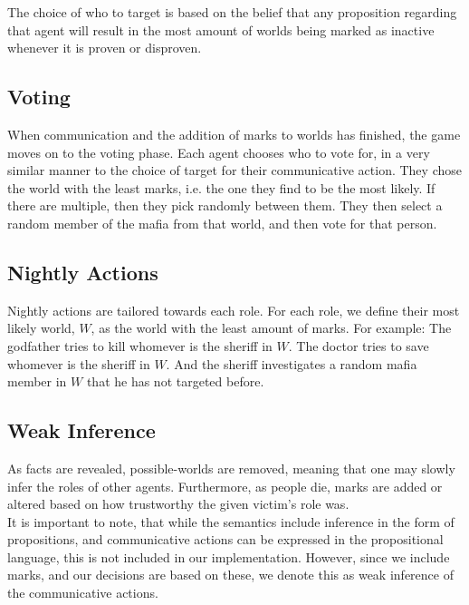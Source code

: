 The choice of who to target is based on the belief that any proposition
regarding that agent will result in the most amount of worlds being marked as
inactive whenever it is proven or disproven.
\subsection{Voting}\label{Voting}
When communication and the addition of marks to worlds has finished, the game
moves on to the voting phase. Each agent chooses who to vote for, in a very
similar manner to the choice of target for their communicative action. They
chose the world with the least marks, i.e. the one they find to be the most
likely. If there are multiple, then they pick randomly between them. They then
select a random member of the mafia from that world, and then vote for that
person.
\subsection{Nightly Actions}\label{NightlyActions}
Nightly actions are tailored towards each role. For each role, we define their
most likely world, $W$, as the world with the least amount of marks. For
example: The godfather tries to kill whomever is the sheriff in $W$. The doctor
tries to save whomever is the sheriff in $W$. And the sheriff investigates a
random mafia member in $W$ that he has not targeted before.
\subsection{Weak Inference}\label{WeakInference}
As facts are revealed, possible-worlds are removed, meaning that one may slowly
infer the roles of other agents. Furthermore, as people die, marks are added or
altered based on how trustworthy the given victim's role was. \\It is important
to note, that while the semantics include inference in the form of
propositions, and communicative actions can be expressed in the propositional
language, this is not included in our implementation. However, since we include
marks, and our decisions are based on these, we denote this as weak inference
of the communicative actions.
